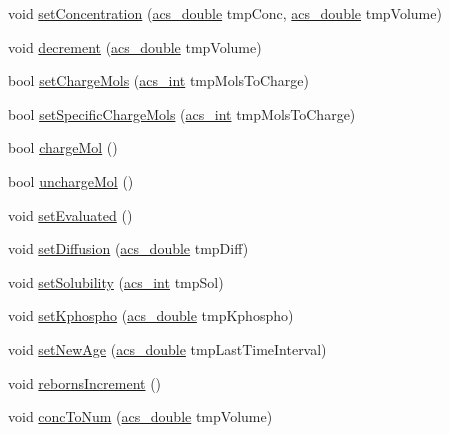 \begin{DoxyCompactItemize}
\item 
void \hyperlink{classspecies_a018a8f55746849f4814b4d281d4aca5a}{set\-Concentration} (\hyperlink{acs__headers_8h_ab776853a005fcbf56af0424a2a4dd607}{acs\-\_\-double} tmp\-Conc, \hyperlink{acs__headers_8h_ab776853a005fcbf56af0424a2a4dd607}{acs\-\_\-double} tmp\-Volume)
\item 
void \hyperlink{classspecies_ae5142c6ab199459bc1d7d5945c761f0e}{decrement} (\hyperlink{acs__headers_8h_ab776853a005fcbf56af0424a2a4dd607}{acs\-\_\-double} tmp\-Volume)
\item 
bool \hyperlink{classspecies_a27f9852312659597efe7925124152286}{set\-Charge\-Mols} (\hyperlink{acs__headers_8h_a8d277355641a098190360234e2ebde35}{acs\-\_\-int} tmp\-Mols\-To\-Charge)
\item 
bool \hyperlink{classspecies_a088763fc6b6279040920d219f314c90e}{set\-Specific\-Charge\-Mols} (\hyperlink{acs__headers_8h_a8d277355641a098190360234e2ebde35}{acs\-\_\-int} tmp\-Mols\-To\-Charge)
\item 
bool \hyperlink{classspecies_adc36fb991695aed6503b8ed82e06bca5}{charge\-Mol} ()
\item 
bool \hyperlink{classspecies_acf8588148932adb86229eec28f7cde7c}{uncharge\-Mol} ()
\item 
void \hyperlink{classspecies_a089da38f8016bd588fa262cd836d1c4d}{set\-Evaluated} ()
\item 
void \hyperlink{classspecies_ab4b4adbc3c26e3a8c81a090c9d1330e3}{set\-Diffusion} (\hyperlink{acs__headers_8h_ab776853a005fcbf56af0424a2a4dd607}{acs\-\_\-double} tmp\-Diff)
\item 
void \hyperlink{classspecies_a27c2d0448e1f56e0962132d8d360fc07}{set\-Solubility} (\hyperlink{acs__headers_8h_a8d277355641a098190360234e2ebde35}{acs\-\_\-int} tmp\-Sol)
\item 
void \hyperlink{classspecies_a4d33fdb252e1884841f9c671ce25973c}{set\-Kphospho} (\hyperlink{acs__headers_8h_ab776853a005fcbf56af0424a2a4dd607}{acs\-\_\-double} tmp\-Kphospho)
\item 
void \hyperlink{classspecies_aa73ab15fb28aefd3b0c6b19e7c9bb944}{set\-New\-Age} (\hyperlink{acs__headers_8h_ab776853a005fcbf56af0424a2a4dd607}{acs\-\_\-double} tmp\-Last\-Time\-Interval)
\item 
void \hyperlink{classspecies_a90d5fc1d90637f2245e8b0ecf228ddfa}{reborns\-Increment} ()
\item 
void \hyperlink{classspecies_a9842732a5dbe0eb67e24148b5d7ae4a2}{conc\-To\-Num} (\hyperlink{acs__headers_8h_ab776853a005fcbf56af0424a2a4dd607}{acs\-\_\-double} tmp\-Volume)

\end{DoxyCompactItemize}
